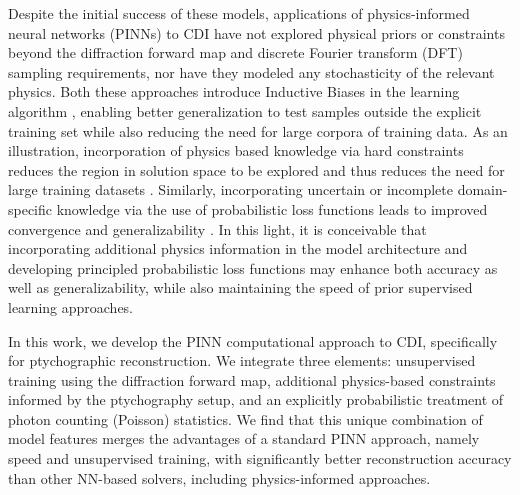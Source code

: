 \documentclass[sn-mathphys]{sn-jnl}%
\theoremstyle{thmstyleone}%
\theoremstyle{thmstyletwo}%
\theoremstyle{thmstylethree}%
\begin{document}
Despite the initial success of these models, applications of physics-informed neural networks (PINNs) to CDI have not explored physical priors or constraints beyond the diffraction forward map and discrete Fourier transform (DFT) sampling requirements, nor have they modeled any stochasticity of the relevant physics. Both these approaches introduce Inductive Biases in the learning algorithm \cite{mitchell1980need, baxter2000model}, enabling better generalization to test samples outside the explicit training set while also reducing the need for large corpora of training data. As an illustration, incorporation of physics based knowledge via hard constraints reduces the region in solution space to be explored and thus reduces the need for large training datasets \cite{baker2019workshop}. Similarly, incorporating uncertain or incomplete domain-specific knowledge via the use of probabilistic loss functions leads to improved convergence and generalizability \cite{baker2019workshop}. In this light, it is conceivable that incorporating additional physics information in the model architecture and developing  principled probabilistic loss functions may enhance both accuracy as well as generalizability, while also maintaining the speed of prior supervised learning approaches. 

In this work, we develop the PINN computational approach to CDI, specifically for ptychographic reconstruction. We integrate three elements: unsupervised training using the diffraction forward map, additional physics-based constraints informed by the ptychography setup, and an explicitly probabilistic treatment of photon counting (Poisson) statistics. We find that this unique combination of model features merges the advantages of a standard PINN approach, namely speed and unsupervised training, with significantly better reconstruction accuracy than other NN-based solvers, including physics-informed approaches.



\end{document}
